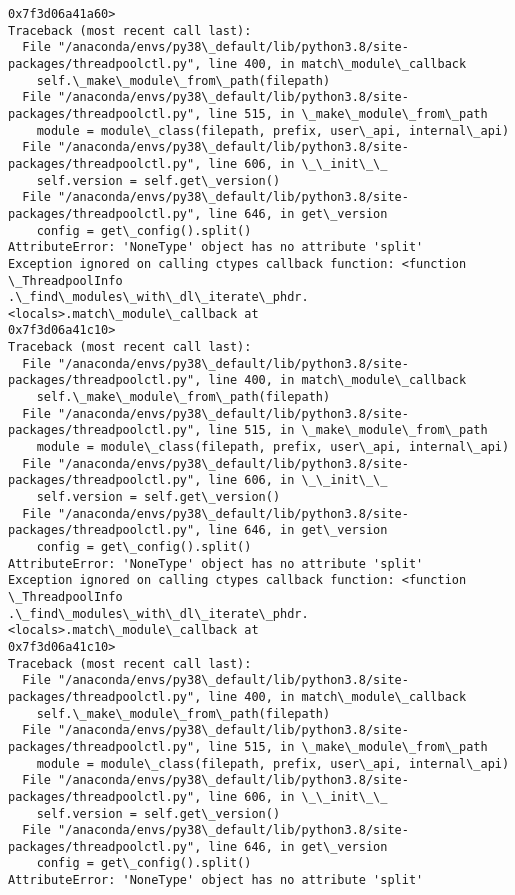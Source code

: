 \documentclass[11pt]{article}
\begin{document}
\begin{Verbatim}[commandchars=\\\{\}]
0x7f3d06a41a60>
Traceback (most recent call last):
  File "/anaconda/envs/py38\_default/lib/python3.8/site-
packages/threadpoolctl.py", line 400, in match\_module\_callback
    self.\_make\_module\_from\_path(filepath)
  File "/anaconda/envs/py38\_default/lib/python3.8/site-
packages/threadpoolctl.py", line 515, in \_make\_module\_from\_path
    module = module\_class(filepath, prefix, user\_api, internal\_api)
  File "/anaconda/envs/py38\_default/lib/python3.8/site-
packages/threadpoolctl.py", line 606, in \_\_init\_\_
    self.version = self.get\_version()
  File "/anaconda/envs/py38\_default/lib/python3.8/site-
packages/threadpoolctl.py", line 646, in get\_version
    config = get\_config().split()
AttributeError: 'NoneType' object has no attribute 'split'
Exception ignored on calling ctypes callback function: <function \_ThreadpoolInfo
.\_find\_modules\_with\_dl\_iterate\_phdr.<locals>.match\_module\_callback at
0x7f3d06a41c10>
Traceback (most recent call last):
  File "/anaconda/envs/py38\_default/lib/python3.8/site-
packages/threadpoolctl.py", line 400, in match\_module\_callback
    self.\_make\_module\_from\_path(filepath)
  File "/anaconda/envs/py38\_default/lib/python3.8/site-
packages/threadpoolctl.py", line 515, in \_make\_module\_from\_path
    module = module\_class(filepath, prefix, user\_api, internal\_api)
  File "/anaconda/envs/py38\_default/lib/python3.8/site-
packages/threadpoolctl.py", line 606, in \_\_init\_\_
    self.version = self.get\_version()
  File "/anaconda/envs/py38\_default/lib/python3.8/site-
packages/threadpoolctl.py", line 646, in get\_version
    config = get\_config().split()
AttributeError: 'NoneType' object has no attribute 'split'
Exception ignored on calling ctypes callback function: <function \_ThreadpoolInfo
.\_find\_modules\_with\_dl\_iterate\_phdr.<locals>.match\_module\_callback at
0x7f3d06a41c10>
Traceback (most recent call last):
  File "/anaconda/envs/py38\_default/lib/python3.8/site-
packages/threadpoolctl.py", line 400, in match\_module\_callback
    self.\_make\_module\_from\_path(filepath)
  File "/anaconda/envs/py38\_default/lib/python3.8/site-
packages/threadpoolctl.py", line 515, in \_make\_module\_from\_path
    module = module\_class(filepath, prefix, user\_api, internal\_api)
  File "/anaconda/envs/py38\_default/lib/python3.8/site-
packages/threadpoolctl.py", line 606, in \_\_init\_\_
    self.version = self.get\_version()
  File "/anaconda/envs/py38\_default/lib/python3.8/site-
packages/threadpoolctl.py", line 646, in get\_version
    config = get\_config().split()
AttributeError: 'NoneType' object has no attribute 'split'

\end{Verbatim}
\end{document}

